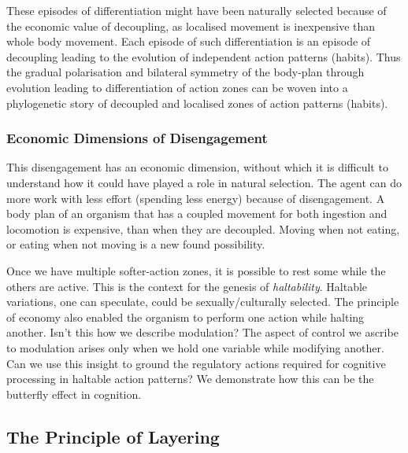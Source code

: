 These episodes of differentiation might have been naturally selected because of the economic value of decoupling, as localised movement is inexpensive than whole body movement. Each episode of such differentiation is an episode of decoupling leading to the evolution of independent action patterns (habits). Thus the gradual polarisation and bilateral symmetry of the body-plan through evolution leading to differentiation of action zones can be woven into a phylogenetic story of decoupled and localised zones of action patterns (habits).

\subsubsection{Economic Dimensions of Disengagement}
This disengagement has an economic dimension, without which it is difficult to understand how it could have played a role in natural selection. The agent can do more work with less effort (spending less energy) because of disengagement. A body plan of an organism that has a coupled movement for both ingestion and locomotion is expensive, than when they are decoupled. Moving when not eating, or eating when not moving is a new found possibility.

Once we have multiple softer-action zones, it is possible to rest some while the others are active. This is the context for the genesis of \textit{haltability}. Haltable variations, one can speculate, could be sexually/culturally selected. The principle of economy also enabled the organism to perform one action while halting another. Isn't this how we describe modulation? The aspect of control we ascribe to modulation arises only when we hold one variable while modifying another. Can we use this insight to ground the regulatory actions required for cognitive processing in haltable action patterns? We demonstrate how this can be the butterfly effect in cognition.

\subsection{The Principle of Layering}
\label{subsec:principle_layering}

